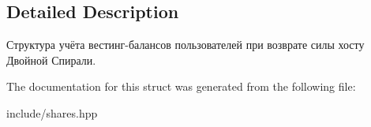 \subsection{Detailed Description}
Структура учёта вестинг-\/балансов пользователей при возврате силы хосту Двойной Спирали. 

The documentation for this struct was generated from the following file\+:\begin{DoxyCompactItemize}
\item 
include/shares.\+hpp\end{DoxyCompactItemize}
